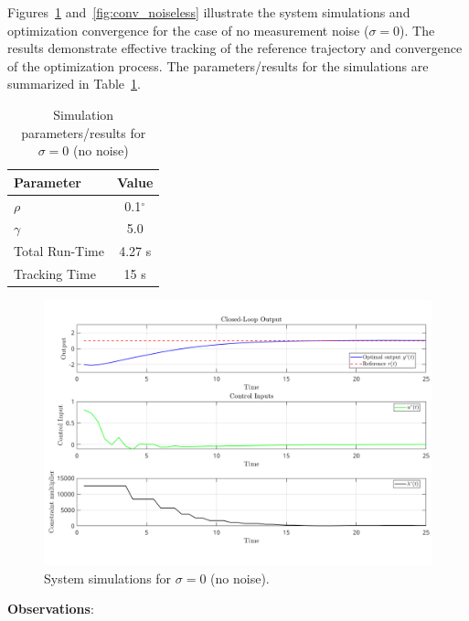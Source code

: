 Figures~\ref{fig:ddpc_noiseless} and~\ref{fig:conv_noiseless} illustrate the system simulations and optimization convergence for the case of no measurement noise ($\sigma = 0$). The results demonstrate effective tracking of the reference trajectory and convergence of the optimization process. The parameters/results for the simulations are summarized in Table~\ref{tab:ddpc_params_double_integrator}.
\begin{table}[h]
    \centering
    \begin{tabular}{l|c}
        \textbf{Parameter} & \textbf{Value} \\
        \hline 
        \hline
        $\rho$ & 0.1$^\circ$ \\
        $\gamma$ & 5.0 \\
        Total Run-Time & 4.27 s \\
        Tracking Time & 15 s \\
        \hline
    \end{tabular}
    \caption{Simulation parameters/results for $\sigma=0$ (no noise)}
    \label{tab:ddpc_params_double_integrator}
\end{table}

\begin{figure}[h]
    \centering
    \includegraphics[width=\textwidth]{figures/closed_loop_noiseless_gamma_5_rho_0p1.png}
    \caption{System simulations for $\sigma = 0$ (no noise).}
    \label{fig:ddpc_noiseless}
\end{figure}

\textbf{Observations}:

